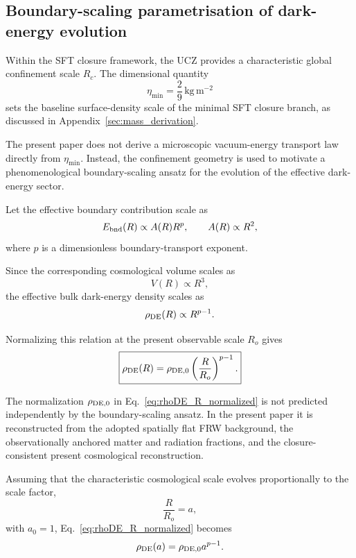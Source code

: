 \documentclass[12pt]{article}
\begin{document}
\subsection{Boundary-scaling parametrisation of dark-energy evolution}
\label{subsec:boundary_energy}

Within the SFT closure framework, the UCZ provides a characteristic
global confinement scale $R_c$. The dimensional quantity
\[
\eta_{\min}
=
\frac{2}{9}\,\mathrm{kg\,m^{-2}}
\]
sets the baseline surface-density scale of the minimal SFT closure
branch, as discussed in Appendix~\ref{sec:mass_derivation}.

The present paper does not derive a microscopic vacuum-energy transport
law directly from $\eta_{\min}$. Instead, the confinement geometry is
used to motivate a phenomenological boundary-scaling ansatz for the
evolution of the effective dark-energy sector.

Let the effective boundary contribution scale as
\begin{equation}
E_{\rm bnd}(R)
\propto
A(R)R^p,
\qquad
A(R)\propto R^2,
\label{eq:Ebnd_scaling}
\end{equation}
where $p$ is a dimensionless boundary-transport exponent.

Since the corresponding cosmological volume scales as
\begin{equation}
V(R)\propto R^3,
\end{equation}
the effective bulk dark-energy density scales as
\begin{equation}
\rho_{\rm DE}(R)
\propto
R^{p-1}.
\label{eq:rhoDE_R_scaling}
\end{equation}

Normalizing this relation at the present observable scale $R_o$ gives
\begin{equation}
\boxed{
\rho_{\rm DE}(R)
=
\rho_{{\rm DE},0}
\left(
\frac{R}{R_o}
\right)^{p-1}.
}
\label{eq:rhoDE_R_normalized}
\end{equation}

The normalization $\rho_{{\rm DE},0}$ in
Eq.~\eqref{eq:rhoDE_R_normalized} is not predicted independently by
the boundary-scaling ansatz. In the present paper it is reconstructed
from the adopted spatially flat FRW background, the observationally
anchored matter and radiation fractions, and the closure-consistent
present cosmological reconstruction.

Assuming that the characteristic cosmological scale evolves
proportionally to the scale factor,
\begin{equation}
\frac{R}{R_o}=a,
\end{equation}
with $a_0=1$, Eq.~\eqref{eq:rhoDE_R_normalized} becomes
\begin{equation}
\rho_{\rm DE}(a)
=
\rho_{{\rm DE},0}a^{p-1}.
\label{eq:rhoDE_a_from_p}
\end{equation}
\end{document}
